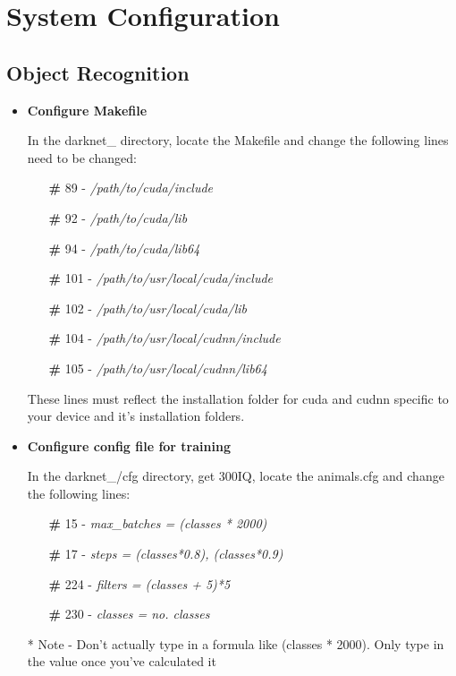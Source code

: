 \chapter{System Configuration}
\section{Object Recognition}

\begin{itemize}
\item \textbf{Configure Makefile}

In the darknet\_ directory, locate the Makefile and change the following lines need to be changed:

\begin{itemize}
    \item[\textbf{\#}] 89  - \textit{/path/to/cuda/include}
    \item[\textbf{\#}] 92 - \textit{/path/to/cuda/lib}
    \item[\textbf{\#}] 94 - \textit{/path/to/cuda/lib64}
    \item[\textbf{\#}] 101 - \textit{/path/to/usr/local/cuda/include}
    \item[\textbf{\#}] 102 - \textit{/path/to/usr/local/cuda/lib}
    \item[\textbf{\#}] 104 - \textit{/path/to/usr/local/cudnn/include}
    \item[\textbf{\#}] 105 - \textit{/path/to/usr/local/cudnn/lib64}
\end{itemize}

These lines must reflect the installation folder for cuda and cudnn specific to your device and it's installation folders.

\item \textbf{Configure config file for training}

In the darknet\_/cfg directory, get 300IQ, locate the animals.cfg and change the following lines:

\begin{itemize}
    \item[\textbf{\#}] 15  - \textit{max\_batches = (classes * 2000)}
    \item[\textbf{\#}] 17 - \textit{steps = (classes*0.8), (classes*0.9)}
    \item[\textbf{\#}] 224 - \textit{filters = (classes + 5)*5}
    \item[\textbf{\#}] 230 - \textit{classes = no. classes}
\end{itemize}

* Note - Don't actually type in a formula like (classes * 2000). Only type in the value once you've calculated it

\end{itemize}